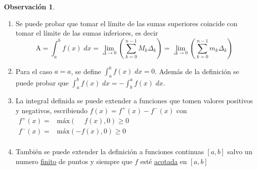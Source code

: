 \documentclass{article}
\theoremstyle{definition}
\newtheorem*{obs}{Observación}
\theoremstyle{remark}
\begin{document}
\begin{obs} \; \\
    \begin{enumerate}
      \item Se puede probar que tomar el límite de las sumas superiores coincide con tomar el límite de las sumas inferiores, es decir
      \[
    \text{A} =\int_{a}^{b}{f(x)\; dx}= \lim_{\Delta \to 0}\left( \sum_{k=0}^{n-1}{M_k\Delta_k}\right)=\lim_{\Delta \to 0}\left( \sum_{k=0}^{n-1}{m_k\Delta_k}\right)
      \]
      \item Para el caso $a=a$, se define $\int_{a}^{b}{f(x)\;dx}=0$. Además de la definición se puede probar que $\int_{a}^{b}f(x)\; dx=-\int_{b}^{a}{f(x)\;dx}$.
      \item La integral definida se puede extender a funciones que tomen valores positivos y negativos, escribiendo $f(x)=f^+(x)-f^-(x)$ con $\begin{array}{lcl}
f^+(x)= & \text{máx}  (\phantom{-}f(x),0) \geq 0 \\
f^-(x)= & \text{máx}  (-f(x),0) \geq 0 \\
  \end{array}$\\


  \begin{figure}[h]
      \centering
      \quad \quad \quad \quad
  \end{figure}
  \pagebreak
      \item También se puede extender la definición a funciones continuas $[a,b]$ salvo un numero \underline{finito} de puntos y siempre que $f$ esté \underline{acotada} en $[a,b]$

      \begin{figure}[h]
      \centering
      \def\svgwidth{0.55\textwidth}
      
      \end{figure}
\end{enumerate}
\end{obs}
\end{document}
